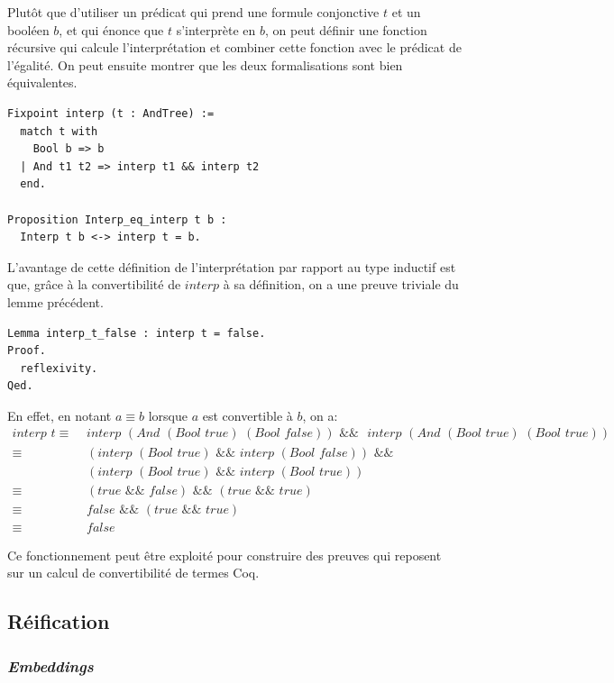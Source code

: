 \documentclass[11pt]{article}
\begin{document}
Plutôt que d'utiliser un prédicat qui prend une formule conjonctive $t$ et un booléen $b$, et qui énonce que $t$ s'interprète en $b$, on peut définir une fonction récursive qui calcule l'interprétation et combiner cette fonction avec le prédicat de l'égalité. On peut ensuite montrer que les deux formalisations sont bien équivalentes.  
\begin{lstlisting}[frame=single]
Fixpoint interp (t : AndTree) :=
  match t with
    Bool b => b
  | And t1 t2 => interp t1 && interp t2
  end.
  
Proposition Interp_eq_interp t b :
  Interp t b <-> interp t = b.
\end{lstlisting}

L'avantage de cette définition de l'interprétation par rapport au type inductif est que, grâce à la convertibilité de $interp$ à sa définition, on a une preuve triviale du lemme précédent.
\begin{lstlisting}[frame=single]
Lemma interp_t_false : interp t = false.
Proof.
  reflexivity.
Qed.
\end{lstlisting}

En effet, en notant $a \equiv b$ lorsque $a$ est convertible à $b$, on a:
\begin{align*}
  interp \,\,t \equiv \,\, &interp\,\, (And \,\,(Bool \,\,true) \,\,(Bool \,\,false)) \,\,\&\& \,\, 
  \,\, interp\,\, (And \,\,(Bool\,\, true) \,\,(Bool\,\, true)) \\
  \equiv \,\, &(interp \,\,(Bool \,\,true) \,\,\&\&\,\, interp \,\,(Bool \,\,false)) \,\,\&\&\,\, \\
  &(interp\,\, (Bool \,\,true) \,\,\&\&\,\, interp \,\,(Bool\,\, true)) \\
  \equiv \,\, &(true \,\,\&\&\,\, false) \,\,\&\&\,\, (true \,\,\&\&\,\, true) \\
  \equiv\,\, &false \,\,\&\&\,\, (true \,\,\&\&\,\, true) \\
  \equiv\,\, &false
\end{align*}  

Ce fonctionnement peut être exploité pour construire des preuves qui reposent sur un calcul de convertibilité de termes Coq.


\subsection{Réification} \label{reification}

\subsubsection{\textit{Embeddings}}
\end{document}
